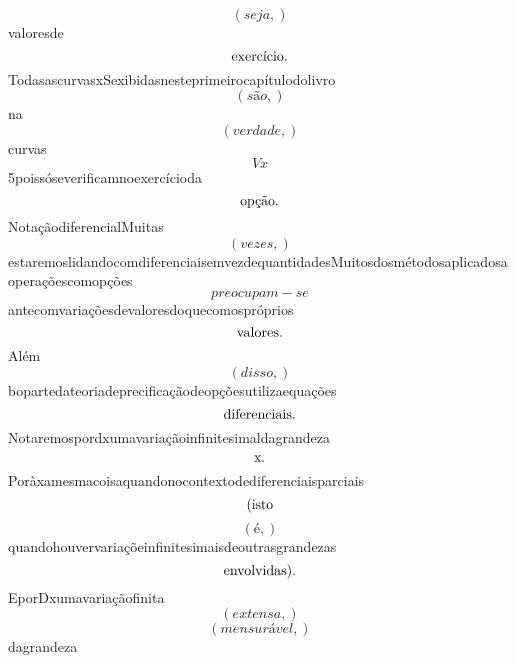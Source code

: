\documentclass{article}
\begin{document}
\begin{equation}
\left( seja,\right)
\end{equation}valoresde\begin{equation}
$exercício.$
\end{equation}TodasascurvasxSexibidasnesteprimeirocapítulodolivro\begin{equation}
\left( são,\right)
\end{equation}na\begin{equation}
\left( verdade,\right)
\end{equation}curvas\begin{equation}
V x
\end{equation}5poissóseverificamnoexercícioda\begin{equation}
$opção.$
\end{equation}NotaçãodiferencialMuitas\begin{equation}
\left( vezes,\right)
\end{equation}estaremoslidandocomdiferenciaisemvezdequantidadesMuitosdosmétodosaplicadosaoperaçõescomopções\begin{equation}
preocupam - se
\end{equation}antecomvariaçõesdevaloresdoquecomospróprios\begin{equation}
$valores.$
\end{equation}Além\begin{equation}
\left( disso,\right)
\end{equation}bopartedateoriadeprecificaçãodeopçõesutilizaequações\begin{equation}
$diferenciais.$
\end{equation}Notaremospordxumavariaçãoinfinitesimaldagrandeza\begin{equation}
$x.$
\end{equation}Poràxamesmacoisaquandonocontextodediferenciaisparciais\begin{equation}
$(isto$
\end{equation}\begin{equation}
\left( é,\right)
\end{equation}quandohouvervariaçõeinfinitesimaisdeoutrasgrandezas\begin{equation}
$envolvidas).$
\end{equation}EporDxumavariaçãofinita\begin{equation}
\left( extensa,\right)
\end{equation}\begin{equation}
\left( mensurável,\right)
\end{equation}dagrandeza\begin{equation}

\end{equation}
\end{document}
